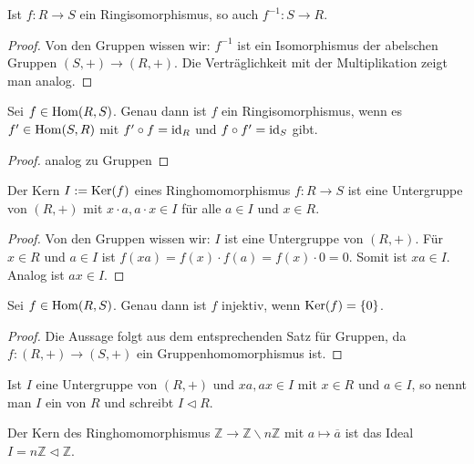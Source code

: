 \begin{lemma}
	Ist $f:R\to S$ ein Ringisomorphismus, so auch $f^{-1}: S\to R$.
\end{lemma}
\begin{proof}
	Von den Gruppen wissen wir: $f^{-1}$ ist ein Isomorphismus der abelschen Gruppen $(S,+)\to (R,+)$. Die Verträglichkeit 
	mit der Multiplikation zeigt man analog.
\end{proof}

\begin{proposition}
	Sei $f\in \operatorname{Hom}(R,S)$. Genau dann ist $f$ ein Ringisomorphismus, wenn es $f'\in \operatorname{Hom}(S,R)$ mit $f'\circ 
	f=\operatorname{id}_R$ und $f\circ f'=\operatorname{id}_S$ gibt.
\end{proposition}
\begin{proof}
	analog zu Gruppen
\end{proof}

\begin{lemma}
	Der Kern $I:=\operatorname{Ker}(f)$ eines Ringhomomorphismus $f:R\to S$ ist eine Untergruppe von $(R,+)$ mit 
	$x\cdot a, a\cdot x \in I$ für alle $a\in I$ und $x\in R$.
\end{lemma}
\begin{proof}
	Von den Gruppen wissen wir: $I$ ist eine Untergruppe von $(R,+)$. Für $x\in R$ und $a \in I$ ist $f(xa)=f(x)\cdot 
	f(a)=f(x)\cdot 0=0$. Somit ist $xa\in I$. Analog ist $ax\in I$.
\end{proof}

\begin{proposition}
	Sei $f\in \operatorname{Hom}(R,S)$. Genau dann ist $f$ injektiv, wenn $\operatorname{Ker}(f)=\{0\}$.
\end{proposition}
\begin{proof}
	Die Aussage folgt aus dem entsprechenden Satz für Gruppen, da $f:(R,+)\to (S,+)$ ein Gruppenhomomorphismus ist.
\end{proof}

\begin{definition}[Ideal]
	Ist $I$ eine Untergruppe von $(R,+)$ und $xa,ax\in I$ mit $x\in R$ und $a\in I$, so nennt 
	man $I$ ein  von $R$ und schreibt $I\vartriangleleft R$.
\end{definition}

\begin{example}
	Der Kern des Ringhomomorphismus $\mathbb Z\to \mathbb Z\backslash n\mathbb Z$ mit $a\mapsto 
	\overline a$ ist das Ideal $I=n\mathbb Z\vartriangleleft \mathbb Z$.
\end{example}